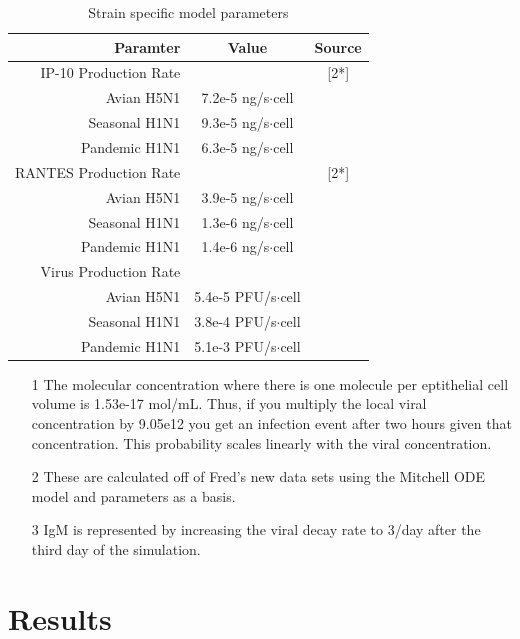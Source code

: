 \documentclass[10pt]{article}
\begin{document}
\begin{table}
\begin{center}
\begin{tabular}{ | r | c | c | }
  \hline                        
  Paramter & Value & Source \\
  \hline
  IP-10 Production Rate &  & [2*]\\
  Avian H5N1 & 7.2e-5 ng/s$\cdot$cell & \\
  Seasonal H1N1 & 9.3e-5 ng/s$\cdot$cell& \\
  Pandemic H1N1 & 6.3e-5 ng/s$\cdot$cell& \\
  \hline
  RANTES Production Rate & & [2*] \\
  Avian H5N1 & 3.9e-5 ng/s$\cdot$cell& \\
  Seasonal H1N1 & 1.3e-6 ng/s$\cdot$cell& \\
  Pandemic H1N1 & 1.4e-6 ng/s$\cdot$cell& \\
  \hline
  Virus Production Rate &  & \cite{Mitchell2011} \\
  Avian H5N1 & 5.4e-5 PFU/s$\cdot$cell& \\
  Seasonal H1N1 & 3.8e-4 PFU/s$\cdot$cell& \\
  Pandemic H1N1 & 5.1e-3 PFU/s$\cdot$cell& \\  
  \hline  
\end{tabular}
\caption{Strain specific model parameters}
\label{table:strains}
\end{center}
\end{table}

\begin{itemize}
\item[1] The molecular concentration where there is one molecule per eptithelial cell volume is 1.53e-17 mol/mL.  Thus, if you multiply the local viral concentration by 9.05e12 you get an infection event after two hours given that concentration.  This probability scales linearly with the viral concentration.
\item[2] These are calculated off of Fred's new data sets using the Mitchell ODE model and parameters as a basis.
\item[3] IgM is represented by increasing the viral decay rate to 3/day after the third day of the simulation.
\end{itemize}


\section*{Results}
\end{document}
